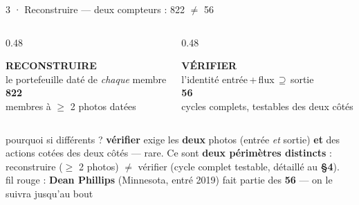 \documentclass[11pt,aspectratio=169]{beamer}
\begin{document}
\begin{frame}{3 · Reconstruire --- deux compteurs : 822 $\neq$ 56}
  \begin{columns}[c]
    \begin{column}{0.48\textwidth}\centering
      \colorbox{helec!12}{\parbox{0.94\linewidth}{\centering\footnotesize\vspace{0.6mm}
        \textbf{RECONSTRUIRE}\\{\scriptsize le portefeuille daté de \emph{chaque} membre}\\[1mm]
        {\Huge\textbf{822}}\\{\scriptsize membres à $\geq$ 2 photos datées}\vspace{0.6mm}}}
    \end{column}
    \begin{column}{0.48\textwidth}\centering
      \colorbox{okgreen!18}{\parbox{0.94\linewidth}{\centering\footnotesize\vspace{0.6mm}
        \textbf{VÉRIFIER}\\{\scriptsize l'identité entrée\,+\,flux\,$\supseteq$\,sortie}\\[1mm]
        {\Huge\textbf{56}}\\{\scriptsize cycles complets, testables des deux côtés}\vspace{0.6mm}}}
    \end{column}
  \end{columns}
  \vspace{2.5mm}
  {\footnotesize pourquoi si différents ? \textbf{vérifier} exige les \textbf{deux} photos
   (entrée \emph{et} sortie) \textbf{et} des actions cotées des deux côtés --- rare. Ce sont
   \textbf{deux périmètres distincts} : reconstruire ($\geq$ 2 photos) $\neq$ vérifier
   (cycle complet testable, détaillé au \textbf{§4}).}\\[1.5mm]
  {\scriptsize\color{black!60} fil rouge : \textbf{Dean Phillips} (Minnesota, entré 2019) fait
   partie des \textbf{56} --- on le suivra jusqu'au bout}
\end{frame}
\end{document}
